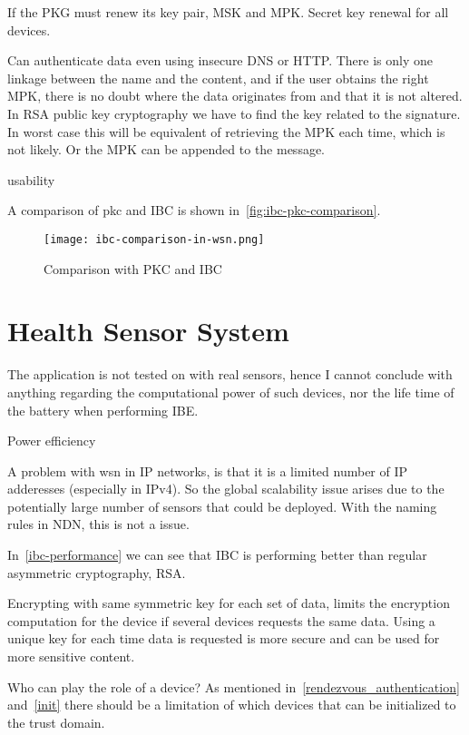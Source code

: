 If the \gls{PKG} must renew its key pair, \gls{MSK} and \gls{MPK}.
Secret key renewal for all devices.

Can authenticate \gls{data} even using insecure DNS or HTTP. 
There is only one linkage between the \gls{name} and the content, and if the user obtains the right \gls{MPK}, there is no doubt where the \gls{data} originates from and that it is not altered.
In RSA public key cryptography we have to find the key related to the signature. 
In worst case this will be equivalent of retrieving the \gls{MPK} each time, which is not likely. 
Or the \gls{MPK} can be appended to the message.

usability 

A comparison of \gls{pkc} and \gls{IBC} is shown in~\autoref{fig:ibc-pkc-comparison}.
\begin{figure}[ht]
  \centering
  \texttt{[image: ibc-comparison-in-wsn.png]}
  \caption{Comparison with PKC and IBC ~\cite[Table 9.6]{Patil:2012:SWS:2464778}}
  \label{fig:ibc-pkc-comparison}
\end{figure}

\section{Health Sensor System}
The application is not tested on with real sensors, hence I cannot conclude with anything regarding the computational power of such devices, nor the life time of the battery when performing \gls{IBE}.  

Power efficiency

A problem with \gls{wsn} in \gls{IP} networks, is that it is a limited number of \gls{IP} adderesses (especially in \gls{IPv4}).
So the global scalability issue arises due to the potentially large number of sensors that could be deployed. 
With the naming rules in \gls{NDN}, this is not a issue.

In~\autoref{ibc-performance} we can see that \gls{IBC} is performing better than regular asymmetric cryptography, RSA. 

Encrypting with same symmetric key for each set of \gls{data}, limits the encryption computation for the device if several devices requests the same \gls{data}.
Using a unique key for each time \gls{data} is requested is more secure and can be used for more sensitive content.

Who can play the role of a device?
As mentioned in~\autoref{rendezvous_authentication} and~\autoref{init} there should be a limitation of which devices that can be initialized to the trust domain.

